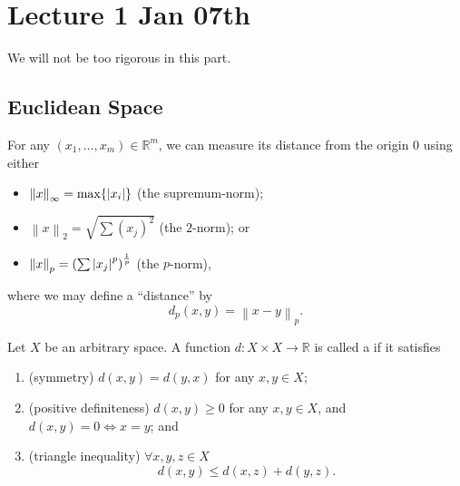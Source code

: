 \documentclass[notoc,notitlepage]{tufte-book}
\newcommand{\norm}[1]{\left\| #1 \right\|}
\begin{document}



\chapter{Lecture 1 Jan 07th}%
\label{chp:lecture_1_jan_07th}
\nocite{johnlee2000}

We will not be too rigorous in this part.

\section{Euclidean Space}%
\label{sec:euclidean_space}

For any $(x_1, \ldots, x_m) \in \mathbb{R}^m$, we can measure its distance from the origin $0$ using either
\begin{itemize}
  \item $\norm{x}_\infty = \max \{ \abs{ x_i } \}$ (the supremum-norm);
  \item $\norm{x}_2 = \sqrt{ \sum (x_j)^2 }$ (the $2$-norm); or
  \item $\norm{x}_p = \left( \sum \abs{ x_j }^p \right)^\frac{1}{p}$ (the $p$-norm),
\end{itemize}
where we may define a ``distance'' by
\begin{equation*}
  d_p(x, y) = \norm{ x - y }_p.
\end{equation*}

\begin{defn}[Metric]\label{defn:metric}
  Let $X$ be an arbitrary space. A function $d : X \times X \to \mathbb{R}$ is called a  if it satisfies
  \begin{enumerate}
    \item (symmetry) $d(x, y) = d(y, x)$ for any $x, y \in X$;
    \item (positive definiteness) $d(x, y) \geq 0$ for any $x, y \in X$, and $d(x, y) = 0 \iff x = y$; and
    \item (triangle inequality) $\forall x, y, z \in X$
      \begin{equation*}
        d(x, y) \leq d(x, z) + d(y, z).
      \end{equation*}
  \end{enumerate}
\end{defn}
\end{document}
